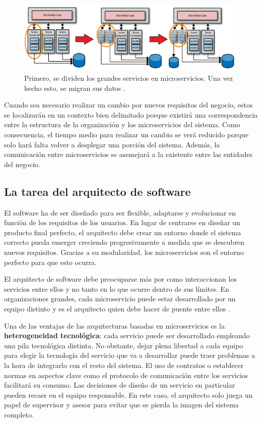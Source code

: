 \documentclass[11pt,spanish,listoffigures]{tfgetsinf}
\begin{document}
\begin{figure}[h]
\centering
\includegraphics[scale=0.4]{refactoring}
\caption{Primero, se dividen los grandes servicios en microservicios. Una vez hecho esto, se migran sus datos \cite{Richards2016}.}
\end{figure}

Cuando sea necesario realizar un cambio por nuevos requisitos del negocio, estos se localizarán en un contexto bien delimitado porque existirá una correspondencia entre la estructura de la organización y los microservicios del sistema. Como consecuencia, el tiempo medio para realizar un cambio se verá reducido porque solo hará falta volver a desplegar una porción del sistema. Además, la comunicación entre microservicios se asemejará a la existente entre las entidades del negocio.

\subsection{La tarea del arquitecto de software}

El software ha de ser diseñado para ser flexible, adaptarse y evolucionar en función de los requisitos de los usuarios. En lugar de centrarse en diseñar un producto final perfecto, el arquitecto debe crear un entorno donde el sistema correcto pueda emerger creciendo progresivamente a medida que se descubren nuevos requisitos. Gracias a su modularidad, los microservicios son el entorno perfecto para que esto ocurra.

El arquitecto de software debe preocuparse más por como interaccionan los servicios entre ellos y no tanto en lo que ocurre dentro de sus límites. En organizaciones grandes, cada microservicio puede estar desarrollado por un equipo distinto y es el arquitecto quien debe hacer de puente entre ellos \cite{Newman2015a}.

Una de las ventajas de las arquitecturas basadas en microservicios es la \textbf{heterogeneidad tecnol\'ogica}: cada servicio puede ser desarrollado empleando una pila tecnológica distinta. No obstante, dejar plena libertad a cada equipo para elegir la tecnología del servicio que va a desarrollar puede traer problemas a la hora de integrarlo con el resto del sistema. El uso de contratos o establecer normas en aspectos clave como el protocolo de comunicación entre los servicios facilitará su consumo. Las decisiones de diseño de un servicio en particular pueden recaer en el equipo responsable. En este caso, el arquitecto solo juega un papel de supervisor y asesor para evitar que se pierda la imagen del sistema completo.
\end{document}
